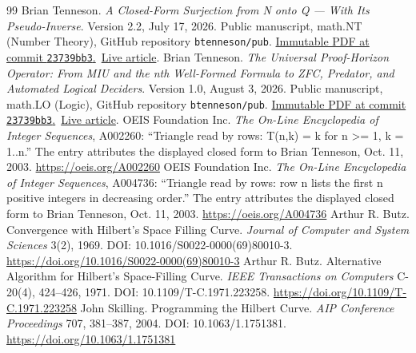 \documentclass[11pt]{article}
\theoremstyle{hilberttheorem}
\begin{document}
\clearpage
{}
{}
\label{references}
\begingroup\small\sloppy
\begin{thebibliography}{99}
 Brian Tenneson. \emph{A Closed-Form Surjection from N onto Q --- With Its Pseudo-Inverse}. Version 2.2, July 17, 2026. Public manuscript, math.NT (Number Theory), GitHub repository \texttt{btenneson/pub}. \href{https://github.com/btenneson/pub/blob/23739bb3bd04be90ef26f33717ac65feb1407b3d/math.NT%20%E2%80%94%20Number%20Theory/A%20Closed-Form%20Surjection%20from%20N%20onto%20Q%20by%20Brian%20Tenneson%202.2.pdf}{Immutable PDF at commit \texttt{23739bb3}.}\ \href{https://btenneson.github.io/pub/papers/closed_form_surjection_n_to_q/}{Live article}.
 Brian Tenneson. \emph{The Universal Proof-Horizon Operator: From MIU and the nth Well-Formed Formula to ZFC, Predator, and Automated Logical Deciders}. Version 1.0, August 3, 2026. Public manuscript, math.LO (Logic), GitHub repository \texttt{btenneson/pub}. \href{https://github.com/btenneson/pub/blob/23739bb3bd04be90ef26f33717ac65feb1407b3d/math.LO%20%E2%80%94%20Logic/The%20Universal%20Proof-Horizon%20Operator%20by%20Brian%20Tenneson%201.0.pdf}{Immutable PDF at commit \texttt{23739bb3}.}\ \href{https://btenneson.github.io/pub/papers/universal_proof_horizon_operator/}{Live article}.
 OEIS Foundation Inc. \emph{The On-Line Encyclopedia of Integer Sequences}, A002260: ``Triangle read by rows: T(n,k) = k for n >= 1, k = 1..n.'' The entry attributes the displayed closed form to Brian Tenneson, Oct. 11, 2003. \url{https://oeis.org/A002260}
 OEIS Foundation Inc. \emph{The On-Line Encyclopedia of Integer Sequences}, A004736: ``Triangle read by rows: row n lists the first n positive integers in decreasing order.'' The entry attributes the displayed closed form to Brian Tenneson, Oct. 11, 2003. \url{https://oeis.org/A004736}
 Arthur R. Butz. Convergence with Hilbert's Space Filling Curve. \emph{Journal of Computer and System Sciences} 3(2), 1969. DOI: 10.1016/S0022-0000(69)80010-3. \url{https://doi.org/10.1016/S0022-0000(69)80010-3}
 Arthur R. Butz. Alternative Algorithm for Hilbert's Space-Filling Curve. \emph{IEEE Transactions on Computers} C-20(4), 424--426, 1971. DOI: 10.1109/T-C.1971.223258. \url{https://doi.org/10.1109/T-C.1971.223258}
 John Skilling. Programming the Hilbert Curve. \emph{AIP Conference Proceedings} 707, 381--387, 2004. DOI: 10.1063/1.1751381. \url{https://doi.org/10.1063/1.1751381}

\end{thebibliography}
\end{document}
